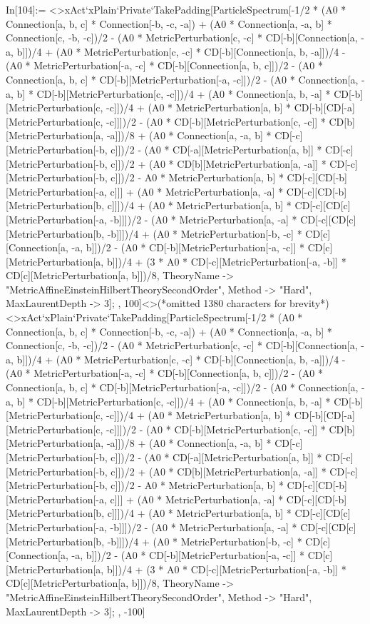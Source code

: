 In[104]:= <>xAct`xPlain`Private`TakePadding[ParticleSpectrum[-1/2 * (A0 * Connection[a, b, c] * Connection[-b, -c, -a]) + (A0 * Connection[a, -a, b] * Connection[c, -b, -c])/2 - (A0 * MetricPerturbation[c, -c] * CD[-b][Connection[a, -a, b]])/4 + (A0 * MetricPerturbation[c, -c] * CD[-b][Connection[a, b, -a]])/4 - (A0 * MetricPerturbation[-a, -c] * CD[-b][Connection[a, b, c]])/2 - (A0 * Connection[a, b, c] * CD[-b][MetricPerturbation[-a, -c]])/2 - (A0 * Connection[a, -a, b] * CD[-b][MetricPerturbation[c, -c]])/4 + (A0 * Connection[a, b, -a] * CD[-b][MetricPerturbation[c, -c]])/4 + (A0 * MetricPerturbation[a, b] * CD[-b][CD[-a][MetricPerturbation[c, -c]]])/2 - (A0 * CD[-b][MetricPerturbation[c, -c]] * CD[b][MetricPerturbation[a, -a]])/8 + (A0 * Connection[a, -a, b] * CD[-c][MetricPerturbation[-b, c]])/2 - (A0 * CD[-a][MetricPerturbation[a, b]] * CD[-c][MetricPerturbation[-b, c]])/2 + (A0 * CD[b][MetricPerturbation[a, -a]] * CD[-c][MetricPerturbation[-b, c]])/2 - A0 * MetricPerturbation[a, b] * CD[-c][CD[-b][MetricPerturbation[-a, c]]] + (A0 * MetricPerturbation[a, -a] * CD[-c][CD[-b][MetricPerturbation[b, c]]])/4 + (A0 * MetricPerturbation[a, b] * CD[-c][CD[c][MetricPerturbation[-a, -b]]])/2 - (A0 * MetricPerturbation[a, -a] * CD[-c][CD[c][MetricPerturbation[b, -b]]])/4 + (A0 * MetricPerturbation[-b, -c] * CD[c][Connection[a, -a, b]])/2 - (A0 * CD[-b][MetricPerturbation[-a, -c]] * CD[c][MetricPerturbation[a, b]])/4 + (3 * A0 * CD[-c][MetricPerturbation[-a, -b]] * CD[c][MetricPerturbation[a, b]])/8, TheoryName -> "MetricAffineEinsteinHilbertTheorySecondOrder", Method -> "Hard", MaxLaurentDepth -> 3]; , 100]<>(*omitted 1380 characters for brevity*)<>xAct`xPlain`Private`TakePadding[ParticleSpectrum[-1/2 * (A0 * Connection[a, b, c] * Connection[-b, -c, -a]) + (A0 * Connection[a, -a, b] * Connection[c, -b, -c])/2 - (A0 * MetricPerturbation[c, -c] * CD[-b][Connection[a, -a, b]])/4 + (A0 * MetricPerturbation[c, -c] * CD[-b][Connection[a, b, -a]])/4 - (A0 * MetricPerturbation[-a, -c] * CD[-b][Connection[a, b, c]])/2 - (A0 * Connection[a, b, c] * CD[-b][MetricPerturbation[-a, -c]])/2 - (A0 * Connection[a, -a, b] * CD[-b][MetricPerturbation[c, -c]])/4 + (A0 * Connection[a, b, -a] * CD[-b][MetricPerturbation[c, -c]])/4 + (A0 * MetricPerturbation[a, b] * CD[-b][CD[-a][MetricPerturbation[c, -c]]])/2 - (A0 * CD[-b][MetricPerturbation[c, -c]] * CD[b][MetricPerturbation[a, -a]])/8 + (A0 * Connection[a, -a, b] * CD[-c][MetricPerturbation[-b, c]])/2 - (A0 * CD[-a][MetricPerturbation[a, b]] * CD[-c][MetricPerturbation[-b, c]])/2 + (A0 * CD[b][MetricPerturbation[a, -a]] * CD[-c][MetricPerturbation[-b, c]])/2 - A0 * MetricPerturbation[a, b] * CD[-c][CD[-b][MetricPerturbation[-a, c]]] + (A0 * MetricPerturbation[a, -a] * CD[-c][CD[-b][MetricPerturbation[b, c]]])/4 + (A0 * MetricPerturbation[a, b] * CD[-c][CD[c][MetricPerturbation[-a, -b]]])/2 - (A0 * MetricPerturbation[a, -a] * CD[-c][CD[c][MetricPerturbation[b, -b]]])/4 + (A0 * MetricPerturbation[-b, -c] * CD[c][Connection[a, -a, b]])/2 - (A0 * CD[-b][MetricPerturbation[-a, -c]] * CD[c][MetricPerturbation[a, b]])/4 + (3 * A0 * CD[-c][MetricPerturbation[-a, -b]] * CD[c][MetricPerturbation[a, b]])/8, TheoryName -> "MetricAffineEinsteinHilbertTheorySecondOrder", Method -> "Hard", MaxLaurentDepth -> 3]; , -100]
